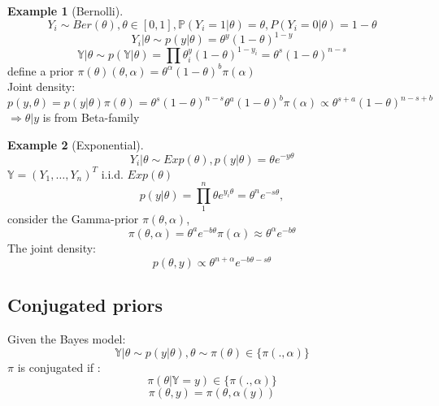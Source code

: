 \documentclass[a4paper,12pt, oneside, fleqn]{book}
\theoremstyle{definition}
\newtheorem*{example}{Example}
\theoremstyle{remark}
\begin{document}
\begin{example}[Bernolli]
\begin{equation*}
	Y_i \sim Ber(\theta), \theta \in [0, 1], \mathbb{P}(Y_i = 1 | \theta) = \theta, P(Y_i = 0|\theta) = 1 - \theta
\end{equation*}	
\begin{equation*}
	Y_i|\theta \sim p(y|\theta) = \theta^y (1 - \theta)^{1 - y}
\end{equation*}
\begin{equation*}
	\mathbb{Y} | \theta \sim p(\mathbb{Y} |\theta) = \prod \theta^y_i (1 - \theta)^{1 - y_i} = \theta^s ( 1 - \theta)^{n - s}
\end{equation*}
define a prior $\pi(\theta)(\theta, \alpha) = \theta^\alpha(1 - \theta)^b \pi(\alpha)$ \\
Joint density:
\begin{equation*}
	p(y, \theta) = p(y|\theta) \pi(\theta) = \theta^s (1 - \theta)^{n - s} \theta^a (1 - \theta)^b \pi(\alpha) \propto
	\theta^{s + a} (1 - \theta)^{n - s + b}
\end{equation*}
$\Rightarrow \theta|y$ is from Beta-family\\
\end{example}

\begin{example}[Exponential]
\begin{equation*}
	Y_i | \theta \sim Exp(\theta), p(y|\theta)= \theta e^{-y \theta}
\end{equation*}	
$\mathbb{Y} = (Y_1, \dots, Y_n)^T$ i.i.d. $Exp(\theta)$\\
\begin{equation*}
	p(y |\theta) = \prod_1^n \theta e^{y_i \theta} = \theta^n e^{-s\theta},
\end{equation*}
consider the Gamma-prior $\pi(\theta, \alpha)$, 
\begin{equation*}
	\pi(\theta, \alpha) = \theta^a e^{-b \theta} \pi(\alpha) \approx \theta^\alpha e^{-b\theta}
\end{equation*}
The joint density:
\begin{equation*}
	p(\theta, y) \propto \theta^{n + \alpha} e^{-b\theta-s\theta}
\end{equation*}
\end{example}

\subsection{Conjugated priors}
Given the Bayes model:
\begin{equation*}
	\mathbb{Y} |\theta \sim p(y | \theta), \theta \sim \pi(\theta) \in \{ \pi(., \alpha) \}
\end{equation*}
$\pi$ is conjugated if :
\begin{equation*}
	\pi(\theta| \mathbb{Y} = y) \in \{ \pi(., \alpha)\}
\end{equation*}
\begin{equation*}
	\pi(\theta, y) = \pi(\theta, \alpha(y))
\end{equation*}
\end{document}
